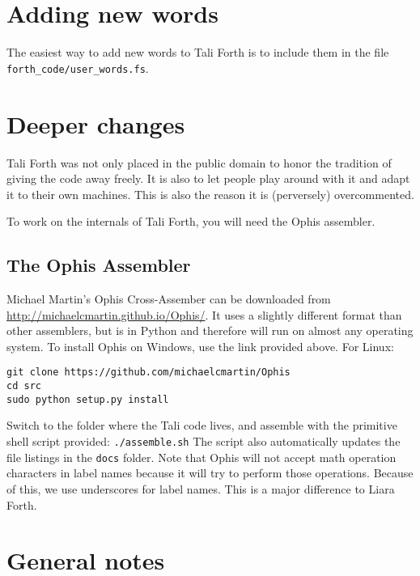\section{Adding new words}

The easiest way to add new words to Tali Forth is to include them in the file
\texttt{forth\_code/user\_words.fs}. 


\section{Deeper changes}

Tali Forth was not only placed in the public domain to honor the tradition of
giving the code away freely. It is also to let people play around with it and
adapt it to their own machines. This is also the reason it is (perversely)
overcommented.

To work on the internals of Tali Forth, you will need the Ophis assembler.

\subsection{The Ophis Assembler}

Michael Martin's Ophis Cross-Assember can be downloaded from
\href{http://michaelcmartin.github.io/Ophis/}{http://michaelcmartin.github.io/Ophis/}.
It uses a slightly different format than other assemblers, but is in Python and
therefore will run on almost any operating system. To install Ophis on Windows,
use the link provided above. For Linux:

\begin{lstlisting}[frame=single]
git clone https://github.com/michaelcmartin/Ophis
cd src
sudo python setup.py install
\end{lstlisting}

Switch to the folder where the Tali code lives, and assemble with the primitive
shell script provided: \texttt{./assemble.sh} The script also automatically
updates the file listings in the \texttt{docs} folder. Note that Ophis will not
accept math operation characters in label names because it will try to perform
those operations. Because of this, we use underscores for label names. This is a
major difference to Liara Forth.



\section{General notes}

